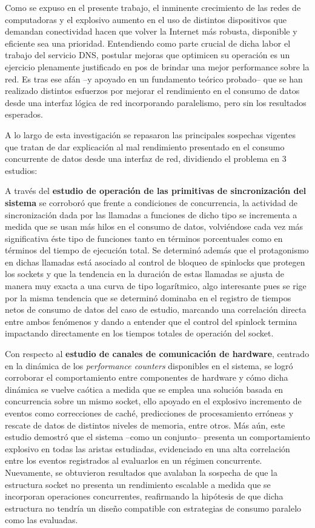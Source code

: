 \begin{conclusion}

Como se expuso en el presente trabajo, el inminente crecimiento de las redes de computadoras y el explosivo aumento en el uso de distintos dispositivos que demandan conectividad hacen que volver la Internet más robusta, disponible y eficiente sea una prioridad. Entendiendo como parte crucial de dicha labor el trabajo del servicio DNS, postular mejoras que optimicen su operación es un ejercicio plenamente justificado en pos de brindar una mejor performance sobre la red. Es tras ese afán --y apoyado en un fundamento teórico probado-- que se han realizado distintos esfuerzos por mejorar el rendimiento en el consumo de datos desde una interfaz lógica de red incorporando paralelismo, pero sin los resultados esperados. 
 
 
A lo largo de esta investigación se repasaron las principales sospechas vigentes que tratan de dar explicación al mal rendimiento presentado en el consumo concurrente de datos desde una interfaz de red, dividiendo el problema en 3 estudios: 
 
 
A través del \textbf{estudio de operación de las primitivas de sincronización del sistema} se corroboró que frente a condiciones de concurrencia, la actividad de sincronización dada por las llamadas a funciones de dicho tipo se incrementa a medida que se usan más hilos en el consumo de datos, volviéndose cada vez más significativa éste tipo de funciones tanto en términos porcentuales como en términos del tiempo de ejecución total. Se determinó además que el protagonismo en dichas llamadas está asociado al control de bloqueo de spinlocks que protegen los sockets y que la tendencia en la duración de estas llamadas se ajusta de manera muy exacta a una curva de tipo logarítmico, algo interesante pues se rige por la misma tendencia que se determinó dominaba en el registro de tiempos netos de consumo de datos del caso de estudio, marcando una correlación directa entre ambos fenómenos y dando a entender que el control del spinlock termina impactando directamente en los tiempos totales de operación del socket. 
 
 
Con respecto al \textbf{estudio de canales de comunicación de hardware}, centrado en la dinámica de los \emph{performance counters} disponibles en el sistema, se logró corroborar el comportamiento entre componentes de hardware y cómo dicha dinámica se vuelve caótica a medida que se emplea una solución basada en concurrencia sobre un mismo socket, ello apoyado en el explosivo incremento de eventos como correcciones de caché, predicciones de procesamiento erróneas y rescate de datos de distintos niveles de memoria, entre otros. Más aún, este estudio demostró que el sistema --como un conjunto-- presenta un comportamiento explosivo en todas las aristas estudiadas, evidenciado en una alta correlación entre los eventos registrados al evaluarlos en un régimen concurrente. Nuevamente, se obtuvieron resultados que avalaban la sospecha de que la estructura socket no presenta un rendimiento escalable a medida que se incorporan operaciones concurrentes, reafirmando la hipótesis de que dicha estructura no tendría un diseño compatible con estrategias de consumo paralelo como las evaluadas. 
 

\end{conclusion}
